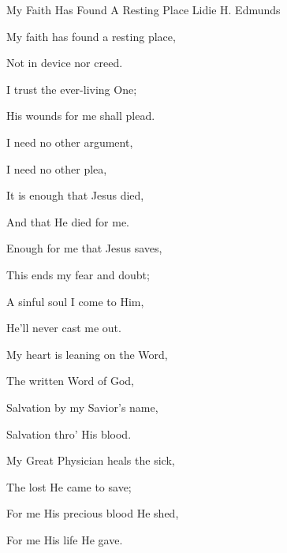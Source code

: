 \documentclass[12pt]{book}
\begin{document}
\begin{song}{My Faith Has Found A Resting Place}{}
  {\SBPubDom}
  {Lidie H. Edmunds}
  {}
  {}

  \begin{SBVerse}
    My faith has found a resting place,

    Not in device nor creed.

    I trust the ever-living One;

    His wounds for me shall plead.
  \end{SBVerse}

  \begin{SBOpGroup}
    I need no other argument,

    I need no other plea,

    It is enough that Jesus died,

    And that He died for me.
  \end{SBOpGroup}

  \begin{SBVerse}
    Enough for me that Jesus saves,

    This ends my fear and doubt;

    A sinful soul I come to Him,

    He'll never cast me out.
  \end{SBVerse}

  \begin{SBVerse}
    My heart is leaning on the Word,

    The written Word of God,

    Salvation by my Savior's name,

    Salvation thro' His blood.
  \end{SBVerse}

  \begin{SBVerse}
    My Great Physician heals the sick,

    The lost He came to save;

    For me His precious blood He shed,

    For me His life He gave.
  \end{SBVerse}
\end{song}
\end{document}
